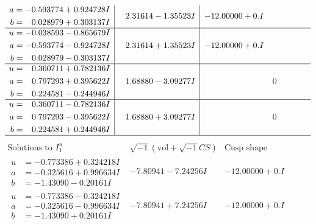 \documentclass[1p]{elsarticle_modified}
\theoremstyle{definition}
\newcommand{\I}{\sqrt{-1}}
\begin{document}
$$\begin{array}{c|c|c}
\begin{aligned}
a &= -0.593774 + 0.924728 I \\
b &= \phantom{-}0.028979 + 0.303137 I\end{aligned}
 & \phantom{-}2.31614 - 1.35523 I & -12.00000 + 0. I\phantom{ +0.000000I} \\ \hline\begin{aligned}
u &= -0.038593 - 0.865679 I \\
a &= -0.593774 - 0.924728 I \\
b &= \phantom{-}0.028979 - 0.303137 I\end{aligned}
 & \phantom{-}2.31614 + 1.35523 I & -12.00000 + 0. I\phantom{ +0.000000I} \\ \hline\begin{aligned}
u &= \phantom{-}0.360711 + 0.782136 I \\
a &= \phantom{-}0.797293 + 0.395622 I \\
b &= \phantom{-}0.224581 - 0.244946 I\end{aligned}
 & \phantom{-}1.68880 - 3.09277 I & \phantom{-0.000000 } 0 \\ \hline\begin{aligned}
u &= \phantom{-}0.360711 - 0.782136 I \\
a &= \phantom{-}0.797293 - 0.395622 I \\
b &= \phantom{-}0.224581 + 0.244946 I\end{aligned}
 & \phantom{-}1.68880 + 3.09277 I & \phantom{-0.000000 } 0\\
 \hline 
 \end{array}$$\newpage$$\begin{array}{c|c|c}  
\text{Solutions to }I^u_{1}& \I (\text{vol} + \sqrt{-1}CS) & \text{Cusp shape}\\
 \hline 
\begin{aligned}
u &= -0.773386 + 0.324218 I \\
a &= -0.325616 + 0.996634 I \\
b &= -1.43090 - 0.20161 I\end{aligned}
 & -7.80941 - 7.24256 I & -12.00000 + 0. I\phantom{ +0.000000I} \\ \hline\begin{aligned}
u &= -0.773386 - 0.324218 I \\
a &= -0.325616 - 0.996634 I \\
b &= -1.43090 + 0.20161 I\end{aligned}
 & -7.80941 + 7.24256 I & -12.00000 + 0. I\phantom{ +0.000000I} \\ \hline\begin{aligned}

\end{aligned}
\end{array}$$
\end{document}
